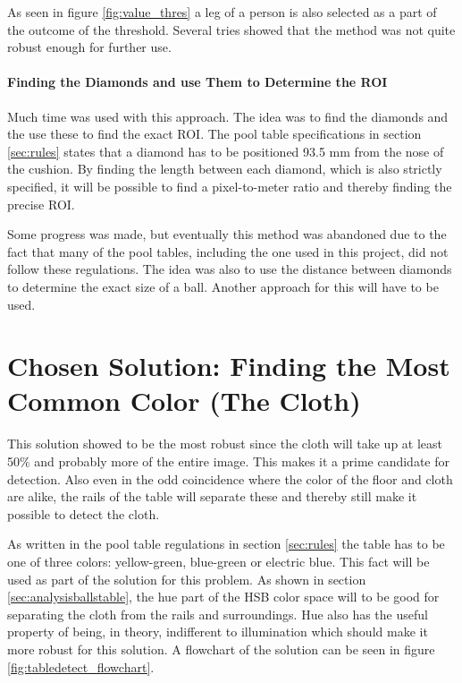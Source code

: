 As seen in figure \ref{fig:value_thres} a leg of a person is also selected as a part of the outcome of the threshold. Several tries showed that the method was not quite robust enough for further use.

\paragraph{Finding the Diamonds and use Them to Determine the ROI}
Much time was used with this approach. The idea was to find the diamonds and the use these to find the exact ROI. The pool table specifications in section \ref{sec:rules} states that a diamond has to be positioned 93.5 mm from the nose of the cushion. By finding the length between each diamond, which is also strictly specified, it will be possible to find a pixel-to-meter ratio and thereby finding the precise ROI.

Some progress was made, but eventually this method was abandoned due to the fact that many of the pool tables, including the one used in this  project, did not follow these regulations. The idea was also to use the distance between diamonds to determine the exact size of a ball. Another approach for this will have to be used.

\section{Chosen Solution: Finding the Most Common Color (The Cloth)}
This solution showed to be the most robust since the cloth will take up at least 50\% and probably more of the entire image. This makes it a prime candidate for detection. Also even in the odd coincidence where the color of the floor and cloth are alike, the rails of the table will separate these and thereby still make it possible to detect the cloth.

As written in the pool table regulations in section \ref{sec:rules} the table has to be one of three colors: yellow-green, blue-green or electric blue. This fact will be used as part of the solution for this problem. As shown in section \ref{sec:analysisballstable}, the hue part of the HSB color space will to be good for separating the cloth from the rails and surroundings. Hue also has the useful property of being, in theory, indifferent to illumination which should make it more robust for this solution. A flowchart of the solution can be seen in figure \ref{fig:tabledetect_flowchart}.


